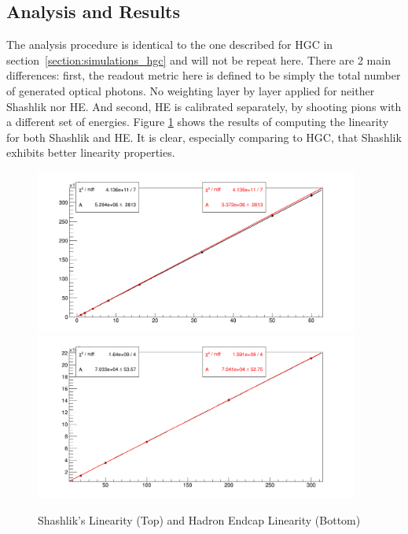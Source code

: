 \subsection{Analysis and Results}
The analysis procedure is identical to the one described for HGC in section~\ref{section:simulations_hgc} and will not be repeat here. There are 2 main differences: first, the readout metric here is defined to be simply the total number of generated optical photons. No weighting layer by layer applied for neither Shashlik nor HE. And second, HE is calibrated separately, by shooting pions with a different set of energies. Figure \ref{fig:simulations_shashlik_linearity} shows the results of computing the linearity for both Shashlik and HE. It is clear, especially comparing to {\sc HGC}, that Shashlik exhibits better linearity properties.
 \begin{figure}[htbp]
    \centering
    \includegraphics[width=0.95\textwidth]{figures/ch_simulations/shashlik/performance/ResponseVsEnergy.png}\\
    \includegraphics[width=0.95\textwidth]{figures/ch_simulations/he/performance/Linearity.png}
    \caption{Shashlik's Linearity (Top) and Hadron Endcap Linearity (Bottom)}
    \label{fig:simulations_shashlik_linearity}
 \end{figure}

